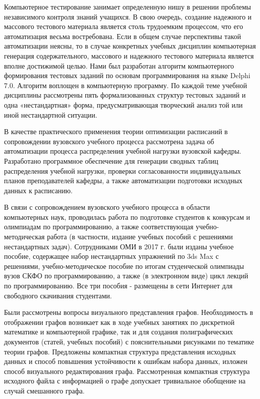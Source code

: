 Компьютерное тестирование занимает определенную нишу в решении проблемы независимого контроля знаний учащихся. В
		свою очередь, создание надежного и массового тестового материала является столь трудоемким процессом, что его
		автоматизация весьма востребована. Если в общем случае перспективы такой автоматизации неясны, то в случае конкретных
		учебных дисциплин компьютерная генерация содержательного, массового и надежного тестового материала является вполне
		достижимой целью. 	
Нами был разработан алгоритм компьютерного формирования тестовых заданий по
			основам программирования на языке Delphi 7.0. 
Алгоритм воплощен в компьютерную программу. По каждой теме учебной дисциплины рассмотрены пять
			формализованных структур тестовых заданий и одна «нестандартная» форма, предусматривающая творческий анализ той или
			иной нестандартной ситуации. 




В качестве практического применения теории оптимизации расписаний в сопровождении вузовского учебного процесса рассмотрена задача об автоматизации процесса распределения учебной нагрузки вузовской кафедры. 
Разработано программное обеспечение для генерации сводных таблиц распределения учебной нагрузки, проверки
согласованности индивидуальных планов преподавателей кафедры, а также автоматизации подготовки исходных данных к
расписанию.




В связи с сопровождением вузовского учебного процесса в области компьютерных наук, проводилась работа по подготовке студентов к конкурсам и олимпиадам по программированию, а также соответствующая учебно-методическая работа (в частности, издание учебных пособий с решениями нестандартных задач). Сотрудниками ОМИ в 2017 г. были изданы учебное пособие, содержащее набор нестандартных упражнений по 3ds Max с решениями, учебно-методическое пособие по итогам студенческой олимпиады вузов СКФО по программированию, а также (в электронном виде) цикл лекций по программированию. Все три пособия \cite{AKM_ch4_bib1}-\cite{AKM_ch4_bib3}  размещены в сети Интернет для свободного скачивания студентами. 


Были рассмотрены вопросы визуального представления графов. Необходимость в отображении графов возникает как в ходе учебных
занятиях по дискретной математике и компьютерной графике, так и для создания полиграфических документов (статей, учебных пособий) с пояснительными рисунками по тематике теории графов. Предложены компактная структура представления исходных данных и способ повышения устойчивости к ошибкам набора данных, изложен способ визуального редактирования графа. Рассмотренная компактная структура исходного файла с информацией о графе допускает тривиальное обобщение на случай смешанного графа. 